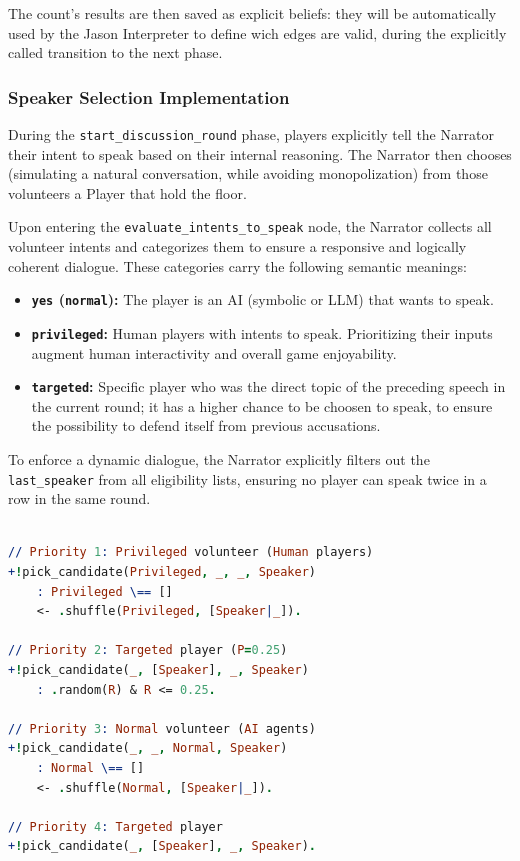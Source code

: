 The count's results are then saved as explicit beliefs: they will be automatically used by the Jason Interpreter to define wich edges are valid, during the explicitly called transition to the  next phase. 

\subsubsection{Speaker Selection Implementation}
\label{subsubsec:speaker_selection}

During the \texttt{start\_discussion\_round} phase, players explicitly tell the Narrator their intent to speak based on their internal reasoning. The Narrator then chooses (simulating a natural conversation, while avoiding monopolization) from those volunteers a Player that hold the floor.

Upon entering the \texttt{evaluate\_intents\_to\_speak} node, the Narrator collects all volunteer intents and categorizes them to ensure a responsive and logically coherent dialogue. These categories carry the following semantic meanings:

\begin{itemize}
    \item \textbf{\texttt{yes} (\texttt{normal}):} The player is an AI (symbolic or LLM) that wants to speak.
    \item \textbf{\texttt{privileged}:} Human players with intents to speak. Prioritizing their inputs augment human interactivity and overall game enjoyability.
    \item \textbf{\texttt{targeted}:} Specific player who was the direct topic of the preceding speech in the current round; it has a higher chance to be choosen to speak, to ensure the  possibility to defend  itself from previous accusations.
\end{itemize}
To enforce a dynamic dialogue, the Narrator explicitly filters out the \texttt{last\_speaker} from all eligibility lists, ensuring no player can speak twice in a row in the same round. 

\vspace{1em}
\begin{lstlisting}[frame=single, language=Prolog, caption={The priority cascade logic for speaker selection, with 4 rules evaluated top to bottom. The arguments needed are list of the players with intent to speak, subdivided in Privileged, Targeted, Normal}, label={lst:speaker_selection}]

// Priority 1: Privileged volunteer (Human players)
+!pick_candidate(Privileged, _, _, Speaker) 
    : Privileged \== []
    <- .shuffle(Privileged, [Speaker|_]).

// Priority 2: Targeted player (P=0.25)
+!pick_candidate(_, [Speaker], _, Speaker) 
    : .random(R) & R <= 0.25.

// Priority 3: Normal volunteer (AI agents)
+!pick_candidate(_, _, Normal, Speaker) 
    : Normal \== []
    <- .shuffle(Normal, [Speaker|_]).

// Priority 4: Targeted player
+!pick_candidate(_, [Speaker], _, Speaker).
\end{lstlisting}

